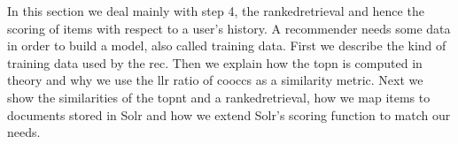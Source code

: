 In this section we deal mainly with step 4, the \gls{rankedretrieval} and hence the scoring of items with respect to a user's history.
A recommender needs some data in order to build a model, also called training data. 
First we describe the kind of training data used by the \gls{rec}. 
Then we explain how the \gls{topn} is computed in theory and why we use the \gls{llr} ratio of \glspl{coocc} as a similarity metric.
Next we show the similarities of the \gls{topnt} and a \gls{rankedretrieval}, how we map items to documents stored in Solr and how we extend Solr's scoring function to match our needs.






